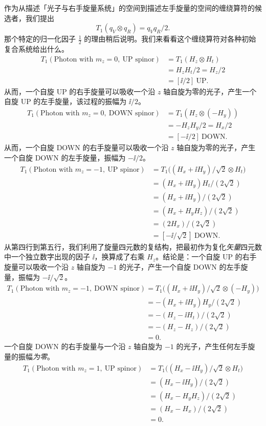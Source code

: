 作为从描述「光子与右手旋量系统」的空间到描述左手旋量的空间的缠绕算符的候选者，我们提出
\begin{equation*}
T_1(q_V\otimes q_R)=q_V q_R/2 .
\end{equation*}
那个特定的归一化因子 $\tfrac12$ 的理由稍后说明。我们来看看这个缠绕算符对各种初始复合系统给出什么。
\begin{align*}
T_1(\text{Photon with }m_z=0,\ \text{UP spinor})
&= T_1(H_z\otimes H_t)\\
&= H_z H_t/2=H_z/2\\
&= [\ii/2]\ \text{UP}.
\end{align*}
从而，一个自旋 UP 的右手旋量可以吸收一个沿 $z$ 轴自旋为零的光子，产生一个自旋 UP 的左手旋量，该过程的振幅为 $\ii/2$。
\begin{align*}
T_1(\text{Photon with }m_z=0,\ \text{DOWN spinor})
&= T_1(H_z\otimes(-H_y))\\
&= -H_z H_y/2=H_x/2\\
&= [-\ii/2]\ \text{DOWN}.
\end{align*}
从而，一个自旋 DOWN 的右手旋量可以吸收一个沿 $z$ 轴自旋为零的光子，产生一个自旋 DOWN 的左手旋量，振幅为 $-\ii/2$。
\begin{align*}
T_1(\text{Photon with }m_z=-1,\ \text{UP spinor})
&= T_1\bigl((H_x+\ii H_y)/\sqrt2\otimes H_t\bigr)\\
&= (H_x+\ii H_y)H_t/(2\sqrt2)\\
&= (H_x+\ii H_y)/(2\sqrt2)\\
&= (H_x+H_y H_z)/(2\sqrt2)\\
&= (2H_x)/(2\sqrt2)\\
&= [-\ii/\sqrt2]\ \text{DOWN}.
\end{align*}
从第四行到第五行，我们利用了旋量四元数的复结构，把最初作为复化\emph{矢量}四元数中一个独立数字出现的因子 $\ii$，换算成了右乘 $H_z$。结论是：一个自旋 UP 的右手旋量可以吸收一个沿 $z$ 轴自旋为 $-1$ 的光子，产生一个自旋 DOWN 的左手旋量，振幅为 $-\ii/\sqrt2$。
\begin{align*}
T_1(\text{Photon with }m_z=-1,\ \text{DOWN spinor})
&= T_1\bigl((H_x+\ii H_y)/\sqrt2\otimes(-H_y)\bigr)\\
&= -(H_x+\ii H_y)H_y/(2\sqrt2)\\
&= -(H_z-\ii H_t)/(2\sqrt2)\\
&= -(H_z-H_z)/(2\sqrt2)\\
&= 0 .
\end{align*}
一个自旋 DOWN 的右手旋量与一个沿 $z$ 轴自旋为 $-1$ 的光子，产生任何左手旋量的振幅\emph{为零}。
\begin{align*}
T_1(\text{Photon with }m_z=1,\ \text{UP spinor})
&= T_1\bigl((H_x-\ii H_y)/\sqrt2\otimes H_t\bigr)\\
&= (H_x-\ii H_y)/(2\sqrt2)\\
&= (H_x-H_y H_z)/(2\sqrt2)\\
&= (H_x-H_x)/(2\sqrt2)\\
&= 0 .
\end{align*}
